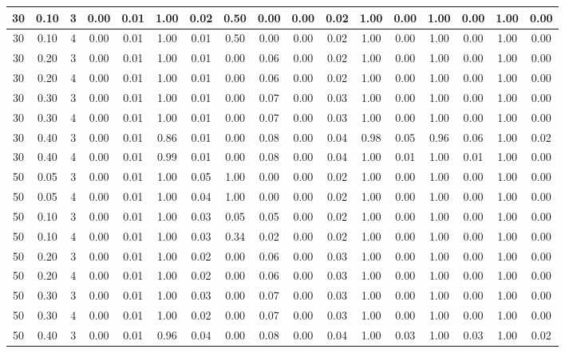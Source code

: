 \documentclass[12pt]{article}
\begin{document}
\begin{table}[H]
{\begin{tabular}{|*{17}{c|}|}
30 & 0.10 & 3 & 0.00 & 0.01 & 1.00 & 0.02 & 0.50 & 0.00 & 0.00 & 0.02 & 1.00 & 0.00 & 1.00 & 0.00 & 1.00 & 0.00 \\ \hline
30 & 0.10 & 4 & 0.00 & 0.01 & 1.00 & 0.01 & 0.50 & 0.00 & 0.00 & 0.02 & 1.00 & 0.00 & 1.00 & 0.00 & 1.00 & 0.00 \\ \hline
30 & 0.20 & 3 & 0.00 & 0.01 & 1.00 & 0.01 & 0.00 & 0.06 & 0.00 & 0.02 & 1.00 & 0.00 & 1.00 & 0.00 & 1.00 & 0.00 \\ \hline
30 & 0.20 & 4 & 0.00 & 0.01 & 1.00 & 0.01 & 0.00 & 0.06 & 0.00 & 0.02 & 1.00 & 0.00 & 1.00 & 0.00 & 1.00 & 0.00 \\ \hline
30 & 0.30 & 3 & 0.00 & 0.01 & 1.00 & 0.01 & 0.00 & 0.07 & 0.00 & 0.03 & 1.00 & 0.00 & 1.00 & 0.00 & 1.00 & 0.00 \\ \hline
30 & 0.30 & 4 & 0.00 & 0.01 & 1.00 & 0.01 & 0.00 & 0.07 & 0.00 & 0.03 & 1.00 & 0.00 & 1.00 & 0.00 & 1.00 & 0.00 \\ \hline
30 & 0.40 & 3 & 0.00 & 0.01 & 0.86 & 0.01 & 0.00 & 0.08 & 0.00 & 0.04 & 0.98 & 0.05 & 0.96 & 0.06 & 1.00 & 0.02 \\ \hline
30 & 0.40 & 4 & 0.00 & 0.01 & 0.99 & 0.01 & 0.00 & 0.08 & 0.00 & 0.04 & 1.00 & 0.01 & 1.00 & 0.01 & 1.00 & 0.00 \\ \hline
50 & 0.05 & 3 & 0.00 & 0.01 & 1.00 & 0.05 & 1.00 & 0.00 & 0.00 & 0.02 & 1.00 & 0.00 & 1.00 & 0.00 & 1.00 & 0.00 \\ \hline
50 & 0.05 & 4 & 0.00 & 0.01 & 1.00 & 0.04 & 1.00 & 0.00 & 0.00 & 0.02 & 1.00 & 0.00 & 1.00 & 0.00 & 1.00 & 0.00 \\ \hline
50 & 0.10 & 3 & 0.00 & 0.01 & 1.00 & 0.03 & 0.05 & 0.05 & 0.00 & 0.02 & 1.00 & 0.00 & 1.00 & 0.00 & 1.00 & 0.00 \\ \hline
50 & 0.10 & 4 & 0.00 & 0.01 & 1.00 & 0.03 & 0.34 & 0.02 & 0.00 & 0.02 & 1.00 & 0.00 & 1.00 & 0.00 & 1.00 & 0.00 \\ \hline
50 & 0.20 & 3 & 0.00 & 0.01 & 1.00 & 0.02 & 0.00 & 0.06 & 0.00 & 0.03 & 1.00 & 0.00 & 1.00 & 0.00 & 1.00 & 0.00 \\ \hline
50 & 0.20 & 4 & 0.00 & 0.01 & 1.00 & 0.02 & 0.00 & 0.06 & 0.00 & 0.03 & 1.00 & 0.00 & 1.00 & 0.00 & 1.00 & 0.00 \\ \hline
50 & 0.30 & 3 & 0.00 & 0.01 & 1.00 & 0.03 & 0.00 & 0.07 & 0.00 & 0.03 & 1.00 & 0.00 & 1.00 & 0.00 & 1.00 & 0.00 \\ \hline
50 & 0.30 & 4 & 0.00 & 0.01 & 1.00 & 0.02 & 0.00 & 0.07 & 0.00 & 0.03 & 1.00 & 0.00 & 1.00 & 0.00 & 1.00 & 0.00 \\ \hline
50 & 0.40 & 3 & 0.00 & 0.01 & 0.96 & 0.04 & 0.00 & 0.08 & 0.00 & 0.04 & 1.00 & 0.03 & 1.00 & 0.03 & 1.00 & 0.02 \\ \hline

\end{tabular}}
\end{table}
\end{document}
